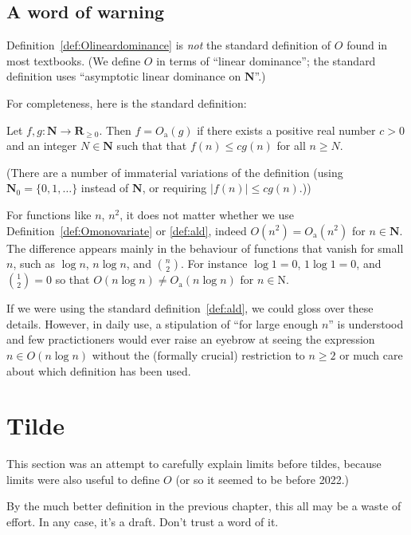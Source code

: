 \documentclass{tstextbook}
\begin{document}
\section{A word of warning}

Definition~\ref{def:Olineardominance}  is \emph{not} the standard definition of $O$ found in most textbooks.
(We define $O$ in terms of ``linear dominance''; the standard definition uses ``asymptotic linear dominance on $\mathbf N$''.)

For completeness, here is the standard definition:

\begin{definition}%
  \label{def:ald}
  Let $f, g\colon \mathbf N\rightarrow \mathbf R_{\geq 0}$.
  Then $f= O_{\mathrm a}(g)$ if there exists a positive real number $c>0$ and an integer $N\in \mathbf{N}$ such that
that \( f(n)\leq cg(n)\) for all $n \geq N$.
\end{definition}

(There are a number of immaterial variations of the  definition (using $\mathbf N_0=\{0,1,\ldots\}$ instead of $\mathbf N$, or requiring $|f(n)|\leq cg(n)$.))

For functions like $n$, $n^2$, it does not matter whether we use Definition~\ref{def:Omonovariate} or \ref{def:ald}, indeed $O(n^2)= O_{\mathrm a}(n^2)$ for $n\in \mathbf N$.
The difference appears mainly in the behaviour of functions that vanish for small $n$, such as $\log n$, $n\log n$, and $\binom{n}{2}$.
For instance $\log 1=0$, $1\log 1 =0$, and $\binom{1}{2}=0$ so that  $O(n\log n)\neq O_{\mathrm a}(n\log n)$ for $n\in \mathrm N$.

If we were using the standard definition~\ref{def:ald}, we could gloss over these details.
However, in daily use, a stipulation of ``for large enough $n$'' is understood and few practictioners would ever raise an eyebrow at seeing the expression $n\in O(n\log n)$ without the (formally crucial) restriction to $n\geq 2$ or much care about which definition has been used.

\chapter{Tilde}


\begin{summary}
  This section was an attempt to carefully explain limits before tildes, because limits were also useful to define $O$ (or so it seemed to be before 2022.)

  By the much better definition in the previous chapter, this all may be a waste of effort.
  In any case, it's a draft.
  Don't trust a word of it.
\end{summary}
\end{document}
